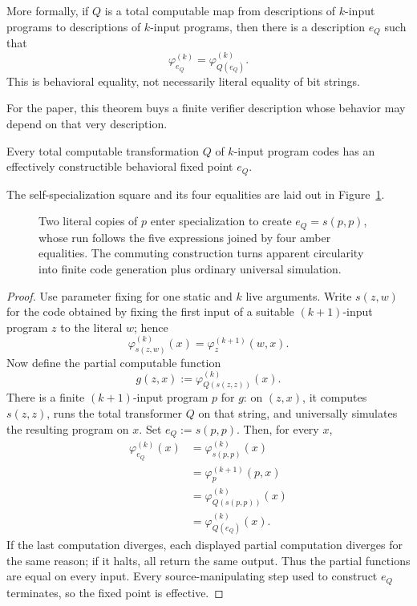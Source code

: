 More formally, if \(Q\) is a total computable map from descriptions of
\(k\)-input programs to descriptions of \(k\)-input programs, then there is a
description \(e_Q\) such that
\[
 \varphi^{(k)}_{e_Q}=\varphi^{(k)}_{Q(e_Q)}.
\]
This is behavioral equality, not necessarily literal equality of bit strings.

For the paper, this theorem buys a finite verifier description whose behavior
may depend on that very description.
\begin{theorem}
\label{thm:refresher-kleene}
Every total computable transformation \(Q\) of \(k\)-input program codes has
an effectively constructible behavioral fixed point \(e_Q\).
\end{theorem}
The self-specialization square and its four equalities are laid out in
Figure~\ref{fig:kleene-square}.

\begin{figure}[t]
\centering

\caption{Two literal copies of \(p\) enter specialization to create \(e_Q=s(p,p)\), whose run follows the five expressions joined by four amber equalities.  The commuting construction turns apparent circularity into finite code generation plus ordinary universal simulation.}
\label{fig:kleene-square}
\end{figure}

\begin{proof}
Use parameter fixing for one static and \(k\) live arguments.  Write \(s(z,w)\)
for the code obtained by fixing the first input of a suitable \((k+1)\)-input
program \(z\) to the literal \(w\); hence
\[
 \varphi^{(k)}_{s(z,w)}(x)=\varphi^{(k+1)}_z(w,x).
\]
Now define the partial computable function
\[
 g(z,x):=\varphi^{(k)}_{Q(s(z,z))}(x).
\]
There is a finite \((k+1)\)-input program \(p\) for \(g\): on \((z,x)\), it
computes \(s(z,z)\), runs the total transformer \(Q\) on that string, and
universally simulates the resulting program on \(x\).  Set
\(e_Q:=s(p,p)\).  Then, for every \(x\),
\[
\begin{aligned}
 \varphi^{(k)}_{e_Q}(x)
 &=\varphi^{(k)}_{s(p,p)}(x)\\
 &=\varphi^{(k+1)}_p(p,x)\\
 &=\varphi^{(k)}_{Q(s(p,p))}(x)\\
 &=\varphi^{(k)}_{Q(e_Q)}(x).
\end{aligned}
\]
If the last computation diverges, each displayed partial computation diverges
for the same reason; if it halts, all return the same output.  Thus the
partial functions are equal on every input.  Every source-manipulating step
used to construct \(e_Q\) terminates, so the fixed point is effective.
\end{proof}

